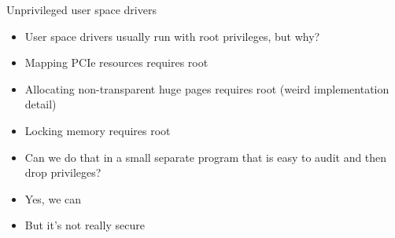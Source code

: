 \documentclass[NET,english,aspectratio=169,notitleframe]{tumbeamer}
\begin{document}


\begin{frame}{Unprivileged user space drivers}
\begin{itemize}
\item User space drivers usually run with root privileges, but why?
\pause
\vspace{1em}
\item Mapping PCIe resources requires root
\item Allocating non-transparent huge pages requires root (weird implementation detail)
\item Locking memory requires root
\vspace{1em}
\item Can we do that in a small separate program that is easy to audit and then drop privileges?
\pause
\item Yes, we can
\item But it's not really secure
\end{itemize}
\end{frame}
\end{document}
